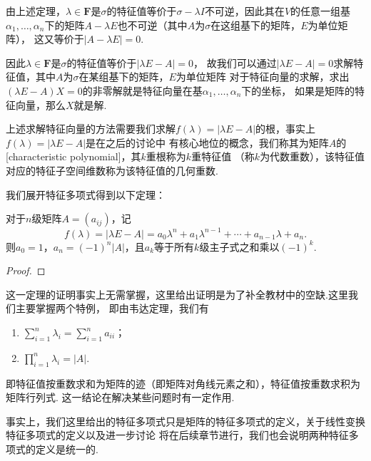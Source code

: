由上述定理，$\lambda\in\mathbf{F}$是$\sigma$的特征值等价于$\sigma-\lambda I$不可逆，因此其在$V$的任意一组基
$\alpha_1,\ldots,\alpha_n$下的矩阵$A-\lambda E$也不可逆（其中$A$为$\sigma$在这组基下的矩阵，$E$为单位矩阵），
这又等价于$|A-\lambda E|=0$.

因此$\lambda\in\mathbf{F}$是$\sigma$的特征值等价于$|\lambda E-A|=0$，
故我们可以通过$|\lambda E-A|=0$求解特征值，其中$A$为$\sigma$在某组基下的矩阵，$E$为单位矩阵
对于特征向量的求解，求出$(\lambda E-A)X=0$的非零解就是特征向量在基$\alpha_1,\ldots,\alpha_n$下的坐标，
如果是矩阵的特征向量，那么$X$就是解.

上述求解特征向量的方法需要我们求解$f(\lambda)=|\lambda E-A|$的根，事实上$f(\lambda)=|\lambda E-A|$是在之后的讨论中
有核心地位的概念，我们称其为矩阵$A$的[characteristic polynomial]，其$k$重根称为$k$重特征值
（称$k$为代数重数），该特征值对应的特征子空间维数称为该特征值的几何重数.

我们展开特征多项式得到以下定理：
\begin{theorem}\label{thm:18:特征多项式展开}
    对于$n$级矩阵$A=(a_{ij})$，记
    \[f(\lambda)=|\lambda E-A|=a_0\lambda^n+a_1\lambda^{n-1}+\cdots+a_{n-1}\lambda+a_n.\]
    则$a_0=1$，$a_n=(-1)^n|A|$，且$a_k$等于所有$k$级主子式之和乘以$(-1)^k$.
\end{theorem}
\begin{proof}
    
\end{proof}

这一定理的证明事实上无需掌握，这里给出证明是为了补全教材中的空缺.这里我们主要掌握两个特例，
即由韦达定理，我们有
\begin{enumerate}
    \item $\displaystyle\sum_{i=1}^{n}\lambda_i=\displaystyle\sum_{i=1}^{n}a_{ii}$；
    \item $\displaystyle\prod_{i=1}^{n}\lambda_i=|A|$.
\end{enumerate}
即特征值按重数求和为矩阵的迹（即矩阵对角线元素之和），特征值按重数求积为矩阵行列式.
这一结论在解决某些问题时有一定作用.

事实上，我们这里给出的特征多项式只是矩阵的特征多项式的定义，关于线性变换特征多项式的定义以及进一步讨论
将在后续章节进行，我们也会说明两种特征多项式的定义是统一的.

